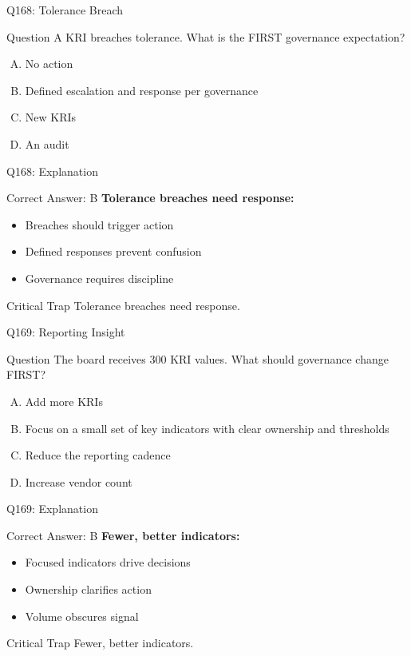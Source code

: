 \documentclass{beamer}
\begin{document}
	\begin{frame}{Q168: Tolerance Breach}
		\begin{block}{Question}
			A KRI breaches tolerance. What is the FIRST governance expectation?
		\end{block}
		\begin{enumerate}[(A)]
			\item No action
			\item Defined escalation and response per governance
			\item New KRIs
			\item An audit
		\end{enumerate}
	\end{frame}
	
	\begin{frame}{Q168: Explanation}
		\begin{block}{Correct Answer: B}
			\textbf{Tolerance breaches need response:}
			\begin{itemize}
				\item Breaches should trigger action
				\item Defined responses prevent confusion
				\item Governance requires discipline
			\end{itemize}
		\end{block}
		\begin{alertblock}{Critical Trap}
			Tolerance breaches need response.
		\end{alertblock}
	\end{frame}
	
	\begin{frame}{Q169: Reporting Insight}
		\begin{block}{Question}
			The board receives 300 KRI values. What should governance change FIRST?
		\end{block}
		\begin{enumerate}[(A)]
			\item Add more KRIs
			\item Focus on a small set of key indicators with clear ownership and thresholds
			\item Reduce the reporting cadence
			\item Increase vendor count
		\end{enumerate}
	\end{frame}
	
	\begin{frame}{Q169: Explanation}
		\begin{block}{Correct Answer: B}
			\textbf{Fewer, better indicators:}
			\begin{itemize}
				\item Focused indicators drive decisions
				\item Ownership clarifies action
				\item Volume obscures signal
			\end{itemize}
		\end{block}
		\begin{alertblock}{Critical Trap}
			Fewer, better indicators.
		\end{alertblock}
	\end{frame}
	
\end{document}
